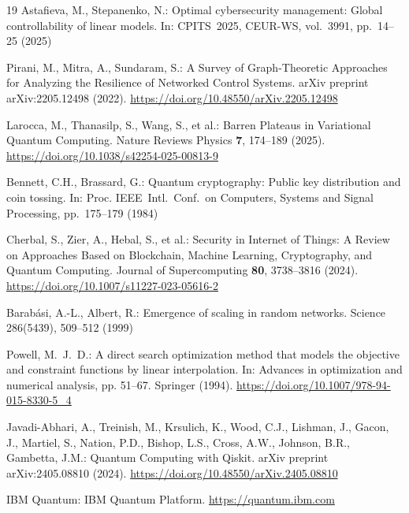 \documentclass[runningheads]{llncs}
\begin{document}
\begin{thebibliography}{19}
Astafieva, M., Stepanenko, N.: Optimal cybersecurity management: Global controllability of linear models. In: CPITS~2025, CEUR-WS, vol.~3991, pp.~14--25 (2025)

Pirani, M., Mitra, A., Sundaram, S.:
A Survey of Graph-Theoretic Approaches for Analyzing the Resilience of Networked Control Systems.
arXiv preprint arXiv:2205.12498 (2022).
\url{https://doi.org/10.48550/arXiv.2205.12498}

Larocca, M., Thanasilp, S., Wang, S., et al.:
Barren Plateaus in Variational Quantum Computing.
Nature Reviews Physics \textbf{7}, 174--189 (2025).
\url{https://doi.org/10.1038/s42254-025-00813-9}

Bennett, C.H., Brassard, G.: Quantum cryptography: Public key distribution and coin tossing. In: Proc. IEEE~Intl.\ Conf.\ on Computers, Systems and Signal Processing, pp.~175--179 (1984)

Cherbal, S., Zier, A., Hebal, S., et al.:
Security in Internet of Things: A Review on Approaches Based on Blockchain, Machine Learning, Cryptography, and Quantum Computing.
Journal of Supercomputing \textbf{80}, 3738--3816 (2024).
\url{https://doi.org/10.1007/s11227-023-05616-2}

Barab\'asi, A.-L., Albert, R.: Emergence of scaling in random networks. Science 286(5439), 509--512 (1999)

Powell, M.~J.~D.: A direct search optimization method that models the objective and constraint functions by linear interpolation. In: Advances in optimization and numerical analysis, pp. 51--67. Springer (1994).
\url{https://doi.org/10.1007/978-94-015-8330-5_4}

Javadi-Abhari, A., Treinish, M., Krsulich, K., Wood, C.J., Lishman, J.,
Gacon, J., Martiel, S., Nation, P.D., Bishop, L.S., Cross, A.W.,
Johnson, B.R., Gambetta, J.M.:
Quantum Computing with Qiskit.
arXiv preprint arXiv:2405.08810 (2024).
\url{https://doi.org/10.48550/arXiv.2405.08810}

IBM Quantum: IBM Quantum Platform. \url{https://quantum.ibm.com}


\end{thebibliography}
\end{document}
